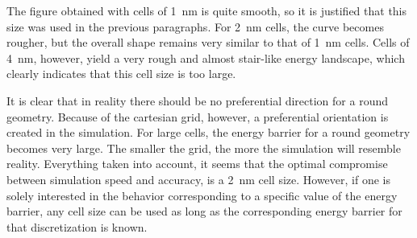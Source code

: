 \documentclass[11pt,a4paper,english]{article}
\begin{document}
The figure obtained with cells of \SI{1}{\nano\metre} is quite smooth, so it is justified that this size was used in the previous paragraphs. For \SI{2}{\nano\metre} cells, the curve becomes rougher, but the overall shape remains very similar to that of \SI{1}{\nano\metre} cells. Cells of \SI{4}{\nano\metre}, however, yield a very rough and almost stair-like energy landscape, which clearly indicates that this cell size is too large. \par
It is clear that in reality there should be no preferential direction for a round geometry. Because of the cartesian grid, however, a preferential orientation is created in the simulation. For large cells, the energy barrier for a round geometry becomes very large.
The smaller the grid, the more the simulation will resemble reality.
Everything taken into account, it seems that the optimal compromise between simulation speed and accuracy, is a \SI{2}{\nano\metre} cell size. However, if one is solely interested in the behavior corresponding to a specific value of the energy barrier, any cell size can be used as long as the corresponding energy barrier for that discretization is known.
\end{document}
